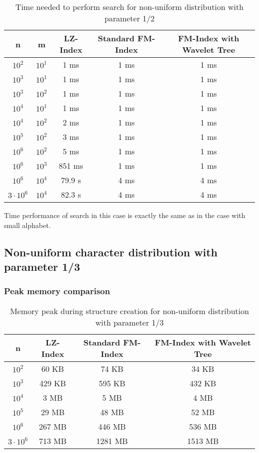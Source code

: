 \begin{table}[H]
\begin{center}
\caption{Time needed to perform search for non-uniform distribution with parameter 1/2}
\begin{tabular}{|c|c|c|c|c|}
\hline
\rowcolor[HTML]{C0C0C0}
n & m & LZ-Index & Standard FM-Index & FM-Index with Wavelet Tree \\ \hline
$10^{2}$ & $10^{1}$ & 1 ms & 1 ms & 1 ms \\ \hline
$10^{3}$ & $10^{1}$ & 1 ms & 1 ms & 1 ms \\ \hline
$10^{3}$ & $10^{2}$ & 1 ms & 1 ms & 1 ms \\ \hline
$10^{4}$ & $10^{1}$ & 1 ms & 1 ms & 1 ms \\ \hline
$10^{4}$ & $10^{2}$ & 2 ms & 1 ms & 1 ms \\ \hline
$10^{5}$ & $10^{2}$ & 3 ms & 1 ms & 1 ms \\ \hline
$10^{6}$ & $10^{2}$ & 5 ms & 1 ms & 1 ms \\ \hline
$10^{6}$ & $10^{3}$ & 851 ms & 1 ms & 1 ms \\ \hline
$10^{6}$ & $10^{4}$ & 79.9 s & 4 ms & 4 ms \\ \hline
$3 \cdot 10^{6}$ & $10^{4}$ & 82.3 s & 4 ms & 4 ms \\ \hline
\end{tabular}
\end{center}
\end{table}

Time performance of search in this case is exactly the same as in the case with small alphabet.

\subsection{Non-uniform character distribution with parameter 1/3}

\subsubsection{Peak memory comparison}

\begin{table}[H]
\begin{center}
\caption{Memory peak during structure creation for non-uniform distribution with parameter 1/3}
\begin{tabular}{|c|c|c|c|}
\hline
\rowcolor[HTML]{C0C0C0}
n & LZ-Index & Standard FM-Index & FM-Index with Wavelet Tree \\ \hline
$10^{2}$ & 60 KB & 74 KB & 34 KB \\ \hline
$10^{3}$ & 429 KB & 595 KB & 432 KB \\ \hline
$10^{4}$ & 3 MB & 5 MB & 4 MB \\ \hline
$10^{5}$ & 29 MB & 48 MB & 52 MB \\ \hline
$10^{6}$ & 267 MB & 446 MB & 536 MB \\ \hline
$3 \cdot 10^{6}$ & 713 MB & 1281 MB & 1513 MB \\ \hline
\end{tabular}
\end{center}
\end{table}


